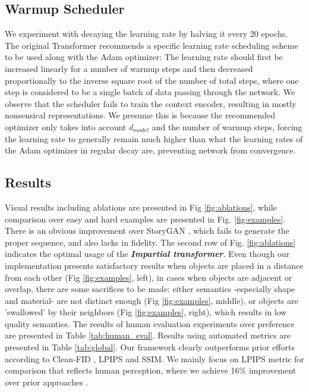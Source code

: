\documentclass{article}
\begin{document}
\subsection{Warmup Scheduler}
We  experiment with decaying the learning rate by halving it every 20 epochs.
The original Transformer \cite{transformer} recommends a specific learning rate scheduling scheme to be used along with the Adam optimizer: The learning rate should first be increased linearly for a number of warmup
steps and then decreased proportionally to the inverse square root of the number of total steps, where one step is considered to be a single batch of data passing through the network. We observe that the scheduler fails to train the context encoder, resulting in mostly nonsensical representations. We presume this is because the recommended optimizer only takes into account $d_{model}$ and the number of warmup steps, forcing the learning rate to generally remain much
higher than what the learning rates of the Adam optimizer in regular decay are,  preventing network
from convergence.

\subsection{Results}
Visual results including ablations are presented in Fig \ref{fig:ablations}, while comparison over easy and hard examples are presented in Fig. \ref{fig:examples}. There is an obvious improvement over StoryGAN \cite{storygan}, which fails to generate the proper sequence, and also lacks in fidelity. The second row of Fig. \ref{fig:ablations} indicates the optimal usage of the \textbf{\textit{Impartial transformer}}.
Even though our implementation presents satisfactory results when objects are placed in a distance from each other (Fig \ref{fig:examples}, left), in cases when objects are adjacent or overlap, there are some sacrifices to be made: either semantics -especially shape and material- are not distinct enough (Fig \ref{fig:examples}, middle), or objects are 'swallowed' by their neighbors (Fig \ref{fig:examples}, right), which results in low quality semantics. 
The results of human evaluation experiments over preference are presented in Table \ref{tab:human_eval}. Results using automated metrics are presented in Table \ref{tab:global}. Our framework clearly outperforms prior efforts \cite{storygan, Maharana2021ImprovingGA, Maharana2021IntegratingVL} according to Clean-FID \cite{cleanfid}, LPIPS \cite{lpips} and SSIM. We mainly focus on LPIPS metric for comparison that reflects human perception, where we achieve 16\% improvement over prior approaches \cite{storygan, Maharana2021ImprovingGA, Maharana2021IntegratingVL}.
\end{document}
